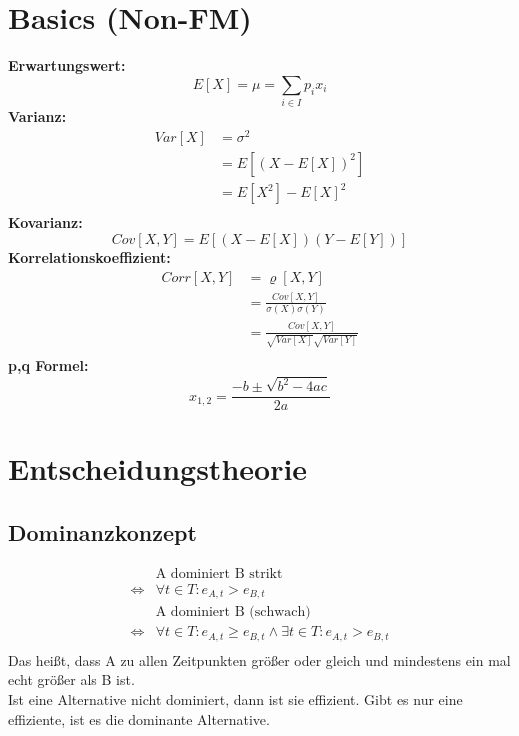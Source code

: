 \documentclass[a4paper]{scrartcl}
\begin{document}
\begin{multicols}{3}

\section{Basics (Non-FM)}

\textbf{Erwartungswert:}
$$E[X]=\mu=\sum_{i \in I} p_i x_i $$
\textbf{Varianz:}
\begin{equation*}
\begin{split}
Var[X]&=\sigma^2\\
      &=E[(X-E[X])^2]\\
      &=E[X^2]-E[X]^2\\
\end{split}
\end{equation*}
\textbf{Kovarianz:}
$$Cov[X,Y]=E[(X-E[X])(Y-E[Y])]$$
\textbf{Korrelationskoeffizient:}
\begin{equation*}
\begin{split}
    Corr[X,Y] &= \varrho [X,Y]\\
              &= \frac{Cov[X,Y]}{\sigma (X) \sigma (Y)}\\
              &= \frac{Cov[X,Y]}{\sqrt{Var[X]}\sqrt{Var[Y]}}\\
\end{split}
\end{equation*}
\textbf{p,q Formel:}
$$x_{1,2}=\frac{-b \pm \sqrt{b^2 - 4ac}}{2a}$$

\section{Entscheidungstheorie}
\subsection{Dominanzkonzept}

\begin{equation*}
\begin{split}
       & \text{A dominiert B strikt} \\
     \Leftrightarrow & \forall t \in T : e_{A,t} > e_{B,t}\\
       & \text{A dominiert B (schwach)} \\
     \Leftrightarrow & \forall t \in T : e_{A,t} \geq e_{B,t} \wedge \exists t \in T : e_{A,t} > e_{B,t}\\
\end{split}
\end{equation*}
Das heißt, dass A zu allen Zeitpunkten größer oder gleich und mindestens ein mal echt größer als B ist.\\
Ist eine Alternative nicht dominiert, dann ist sie effizient. Gibt es nur eine effiziente, ist es die dominante Alternative.


\end{multicols}
\end{document}
